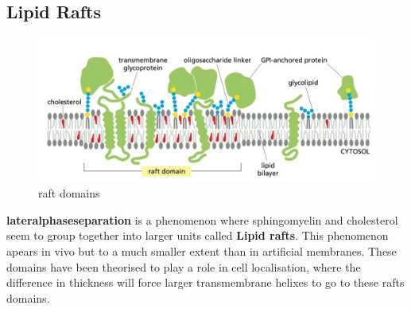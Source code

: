 \documentclass[../main.tex]{subfiles}
\begin{document}
    \subsection{Lipid Rafts}
    \begin{figure}[H]
        \centering
        \includegraphics[width=1\linewidth]{rafts.png}
        \caption{raft domains}
        \label{fig:enter-label}
    \end{figure}

    \textbf{\gls{lateralphaseseparation}} is a phenomenon where sphingomyelin and cholesterol seem to group together into larger units called \textbf{Lipid rafts}. This phenomenon apears in vivo but to a much smaller extent than in artificial membranes. These domains have been theorised to play a role in cell localisation, where the difference in thickness will force larger transmembrane helixes to go to these rafts domains.


\printglossaries
\end{document}

